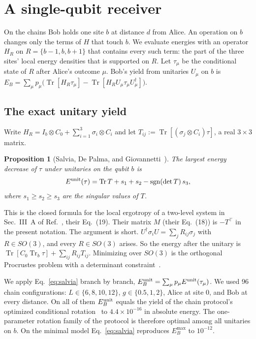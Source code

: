 \documentclass[aps,pra,twocolumn,reprint,superscriptaddress,nofootinbib,floatfix]{revtex4-2}
\theoremstyle{plain}
\newtheorem{proposition}{Proposition}
\theoremstyle{remark}
\newcommand{\Tr}{\operatorname{Tr}}
\newcommand{\sgn}{\operatorname{sgn}}
\begin{document}
\section{A single-qubit receiver}
\label{sec:single}

On the chains Bob holds one site $b$ at distance $d$ from Alice. An operation on $b$
changes only the terms of $H$ that touch $b$. We evaluate energies with an operator $H_R$ on
$R=\{b-1,b,b+1\}$ that contains every such term: the part of the three sites' local energy
densities that is supported on $R$. Let $\tau_\mu$
be the conditional state of $R$ after Alice's outcome $\mu$. Bob's yield from unitaries
$U_\mu$ on $b$ is $E_B=\sum_\mu
p_\mu\big(\Tr[H_R\tau_\mu]-\Tr[H_RU_\mu\tau_\mu U_\mu^\dagger]\big)$.

\subsection{The exact unitary yield}

Write $H_R=I_b\otimes C_0+\sum_{i=1}^3\sigma_i\otimes C_i$ and let
$T_{ij}:=\Tr[(\sigma_j\otimes C_i)\tau]$, a real $3\times3$ matrix.

\begin{proposition}[Salvia, De Palma, and Giovannetti~\cite{Salvia2023}]
\label{prop:salvia}
The largest energy decrease of $\tau$ under unitaries on the qubit $b$ is
\begin{equation}
E^{\rm unit}(\tau)=\Tr T+s_1+s_2-\sgn(\det T)\,s_3 ,
\label{eq:salvia}
\end{equation}
where $s_1\ge s_2\ge s_3$ are the singular values of $T$.
\end{proposition}

This is the closed formula for the local ergotropy of a two-level system in Sec.~III~A
of Ref.~\cite{Salvia2023}, their Eq.~(19). Their matrix $M$ (their Eq.~(18)) is $-T^{\top}$ in
the present notation. The argument is short. $U^\dagger\sigma_iU=\sum_jR_{ij}\sigma_j$ with
$R\in SO(3)$, and every $R\in SO(3)$ arises. So the energy after the unitary is
$\Tr[C_0\Tr_b\tau]+\sum_{ij}R_{ij}T_{ij}$. Minimizing over $SO(3)$ is the orthogonal
Procrustes problem with a determinant constraint~\cite{Kabsch1976}.

We apply Eq.~\eqref{eq:salvia} branch by branch,
$E_B^{\rm unit}=\sum_\mu p_\mu E^{\rm unit}(\tau_\mu)$. We used 96 chain configurations:
$L\in\{6,8,10,12\}$, $g\in\{0.5,1,2\}$, Alice at site 0, and Bob at every distance. On all of
them $E_B^{\rm unit}$ equals the yield of the chain protocol's optimized conditional
rotation~\cite{Hotta2009} to $4.4\times10^{-16}$ in absolute energy. The one-parameter
rotation family of the protocol is therefore optimal among all unitaries on $b$. On the
minimal model Eq.~\eqref{eq:salvia} reproduces $E_B^{\max}$ to $10^{-12}$.
\end{document}
